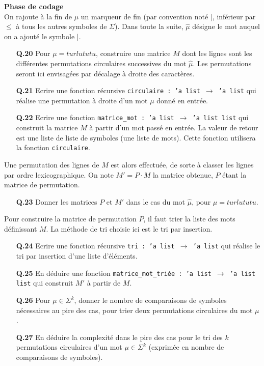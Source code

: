 \documentclass[11pt,a4paper]{article}\nofiles
\begin{document}
\textbf{Phase de codage}\\
On rajoute \`a la fin de $\mu$ un marqueur de fin (par convention not\'e $|$, inf\'erieur par $\leq$ \`a tous les autres symboles de $\Sigma$). 
Dans toute la suite, $\hat{\mu}$ d\'esigne le mot auquel on a ajout\'e le symbole $|$. 
\begin{enumerate}
\item[{\bf Q.20}] Pour $\mu=turlututu$, construire une matrice $M$ dont les lignes sont les diff\'erentes permutations circulaires successives du mot $\hat{\mu}$. Les permutations seront ici envisag\'ees par d\'ecalage \`a droite des caract\`eres.
\item[{\bf Q.21}] Ecrire une fonction r\'ecursive \texttt{circulaire : 'a list $\to$ 'a list} qui r\'ealise une permutation \`a droite d'un mot $\mu$ donn\'e en entr\'ee.
\item[{\bf Q.22}] Ecrire une fonction \texttt{matrice\_mot : 'a list $\to$ 'a list list} qui construit la matrice $M$ \`a partir d'un mot pass\'e en entr\'ee. 
La valeur de retour est une liste de liste de symboles (une liste de mots). Cette fonction utilisera la fonction \texttt{circulaire}.
\end{enumerate}
Une permutation des lignes de $M$ est alors effectu\'ee, de sorte \`a classer les lignes par ordre lexicographique. On note $M'=P\cdot M$ la matrice obtenue, $P$ \'etant la matrice de permutation.
\begin{enumerate}
\item[{\bf Q.23}] Donner les matrices $P$ et $M'$ dans le cas du mot $\hat{\mu}$, pour $\mu=turlututu$.
\end{enumerate}
 Pour construire la matrice de permutation $P$, il faut trier la liste des mots d\'efinissant $M$. La m\'ethode de tri choisie ici est le tri par insertion.
\begin{enumerate}
\item[{\bf Q.24}] Ecrire une fonction r\'ecursive \texttt{tri : 'a list $\to$ 'a list} qui r\'ealise le tri par insertion d'une liste d'\'el\'ements.
\item[{\bf Q.25}] En d\'eduire une fonction \texttt{matrice\_mot\_tri\'ee : 'a list $\to$ 'a list list} qui construit $M'$ \`a partir de $M$.
\item[{\bf Q.26}] Pour $\mu\in \Sigma^k$, donner le nombre de comparaisons de symboles n\'ecessaires au pire des cas, pour trier deux permutations circulaires du mot $\mu$.
\item[{\bf Q.27}] En d\'eduire la complexit\'e dans le pire des cas pour le tri des $k$ permutations circulaires d'un mot $\mu\in \Sigma^k$ (exprim\'ee en nombre de comparaisons de symboles).
\end{enumerate}
\end{document}
